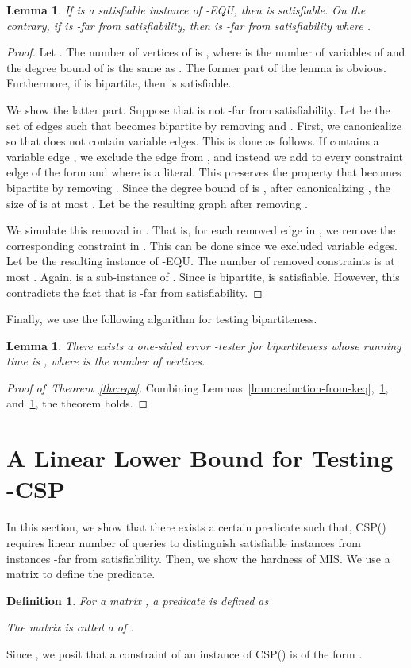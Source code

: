 \documentclass[letterpaper,11pt]{article}
\newtheorem{lemma}[theorem]{Lemma}
\newtheorem{definition}[theorem]{Definition}
\newcommand{\mis}{\textsf{MIS}\xspace}
\newcommand{\kcsp}{\textsf{-CSP}\xspace}
\newcommand{\csp}[1]{\textsf{CSP}(#1)\xspace}
\newcommand{\equ}{\textsf{EQU}\xspace}
\begin{document}
\begin{lemma}\label{lmm:reduction-from-2eq}
  If  is a satisfiable instance of \textsf{-\equ},
  then  is satisfiable.
  On the contrary, if  is -far from satisfiability,
  then  is -far from satisfiability where .
\end{lemma}
\begin{proof}
  Let .
  The number of vertices of  is ,
  where  is the number of variables of  and the degree bound  of  is the same as .
  The former part of the lemma is obvious.
  Furthermore, if  is bipartite, then  is satisfiable.
  
  We show the latter part.
  Suppose that  is not -far from satisfiability.
  Let  be the set of edges such that  becomes bipartite by removing  and .
  First, we canonicalize  so that  does not contain variable edges.
  This is done as follows.
  If  contains a variable edge ,
  we exclude the edge from ,
  and instead we add to  every constraint edge of the form  and  where  is a literal.
  This preserves the property that  becomes bipartite by removing .
  Since the degree bound of  is ,
  after canonicalizing , 
  the size of  is at most .
  Let  be the resulting graph after removing .

  We simulate this removal in .
  That is, for each removed edge in ,
  we remove the corresponding constraint in .
  This can be done since we excluded variable edges.
  Let  be the resulting instance of -\equ.
  The number of removed constraints is at most .
  Again,  is a sub-instance of .
  Since  is bipartite, 
   is satisfiable.
  However, this contradicts the fact that  is -far from satisfiability.
\end{proof}

Finally, we use the following algorithm for testing bipartiteness.
\begin{lemma}\cite{GR99}\label{lmm:bipartiteness}
  There exists a one-sided error -tester for bipartiteness whose running time is ,
  where  is the number of vertices.
\end{lemma}
\begin{proof}[Proof of~Theorem~\ref{thr:equ}]
Combining Lemmas~\ref{lmm:reduction-from-keq},~\ref{lmm:reduction-from-2eq}, and~\ref{lmm:bipartiteness}, 
the theorem holds.
\end{proof}

\section{A Linear Lower Bound for Testing \kcsp}\label{apx:kcsp}
In this section, 
we show that there exists a certain predicate  such that,
\csp{} requires linear number of queries to distinguish satisfiable instances from instances -far from satisfiability.
Then, we show the hardness of \mis.
We use a matrix to define the predicate.
\begin{definition}
  For a matrix , a predicate  is defined as
  
  The matrix  is called a  of .
\end{definition}
Since , 
we posit that a constraint of an instance of \csp{} is of the form .
\end{document}
